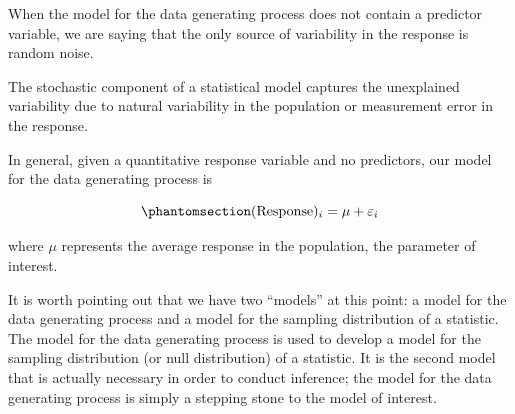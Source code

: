 \documentclass[
  letterpaper,
  DIV=11,
  numbers=noendperiod]{scrreprt}
\theoremstyle{plain}
\theoremstyle{definition}
\theoremstyle{definition}
\theoremstyle{remark}
\begin{document}
When the model for the data generating process does not contain a
predictor variable, we are saying that the only source of variability in
the response is random noise.

\begin{tcolorbox}[enhanced jigsaw, breakable, titlerule=0mm, colframe=quarto-callout-tip-color-frame, bottomtitle=1mm, opacityback=0, rightrule=.15mm, toptitle=1mm, arc=.35mm, bottomrule=.15mm, left=2mm, title=\textcolor{quarto-callout-tip-color}{\faLightbulb}\hspace{0.5em}{Big Idea}, leftrule=.75mm, coltitle=black, toprule=.15mm, colbacktitle=quarto-callout-tip-color!10!white, colback=white, opacitybacktitle=0.6]

The stochastic component of a statistical model captures the unexplained
variability due to natural variability in the population or measurement
error in the response.

\end{tcolorbox}

\begin{tcolorbox}[enhanced jigsaw, breakable, titlerule=0mm, colframe=quarto-callout-important-color-frame, bottomtitle=1mm, opacityback=0, rightrule=.15mm, toptitle=1mm, arc=.35mm, bottomrule=.15mm, left=2mm, title=\textcolor{quarto-callout-important-color}{\faExclamation}\hspace{0.5em}{Data Generating Process for Single Mean Response}, leftrule=.75mm, coltitle=black, toprule=.15mm, colbacktitle=quarto-callout-important-color!10!white, colback=white, opacitybacktitle=0.6]

In general, given a quantitative response variable and no predictors,
our model for the data generating process is

\begin{equation}\phantomsection\label{eq-single-mean}{(\text{Response})_i = \mu + \varepsilon_i}\end{equation}

where \(\mu\) represents the average response in the population, the
parameter of interest.

\end{tcolorbox}

It is worth pointing out that we have two ``models'' at this point: a
model for the data generating process and a model for the sampling
distribution of a statistic. The model for the data generating process
is used to develop a model for the sampling distribution (or null
distribution) of a statistic. It is the second model that is actually
necessary in order to conduct inference; the model for the data
generating process is simply a stepping stone to the model of interest.
\end{document}
